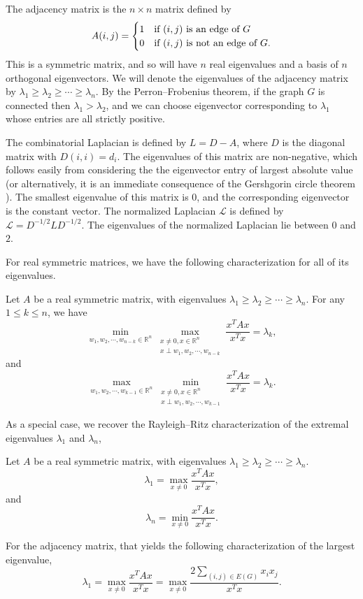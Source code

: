 The adjacency matrix is the $n \times n$ matrix defined by
\[
 A(i,j) =
  \begin{cases} 
      \hfill 1 \hfill & \text{if $(i,j)$ is an edge of $G$} \\
      \hfill 0 \hfill & \text{if $(i,j)$ is not an edge of $G$.} \\
  \end{cases}
\]
This is a symmetric matrix, and so will have $n$ real eigenvalues and a basis of
$n$ orthogonal eigenvectors.  We will denote the eigenvalues of the adjacency matrix
by $\lambda_1 \geq \lambda_2 \geq \cdots \geq \lambda_n$.  By the Perron--Frobenius theorem,
if the graph $G$ is connected then $\lambda_1 > \lambda_2$, and we can choose
eigenvector corresponding to $\lambda_1$ whose entries are all strictly positive.


The combinatorial Laplacian is defined by $L = D - A$, where $D$ is the diagonal matrix
with $D(i,i) = d_i$.  The eigenvalues of this matrix are non-negative, which follows
easily from considering the the eigenvector entry of largest absolute value (or alternatively,
it is an immediate consequence of the Gershgorin circle theorem \cite{HornJohnson2012}).
The smallest eigenvalue of this matrix is $0$, and the corresponding eigenvector is the
constant vector.
The normalized Laplacian $\mathcal{L}$ is defined by $\mathcal{L} = D^{-1/2} L D^{-1/2}$.
The eigenvalues of the normalized Laplacian lie between $0$ and $2$.

For real symmetric matrices, we have the following characterization for all of its eigenvalues.
\begin{theorem}
  Let $A$ be a real symmetric matrix, with
   eigenvalues $\lambda_1 \geq \lambda_2 \geq \cdots \geq \lambda_n$.
  For any $1 \leq k \leq n$, we have
  \[ \min_{w_1, w_2, \cdots, w_{n-k} \in \mathbb{R}^n} \max_{\substack{x\neq 0, x \in \mathbb{R}^n\\x \perp w_1, w_2, \cdots, w_{n-k}}} \frac{x^T A x}{x^T x} = \lambda_k, \]
  and
  \[ \max_{w_1, w_2, \cdots, w_{k-1} \in \mathbb{R}^n} \min_{\substack{x\neq 0, x \in \mathbb{R}^n\\x \perp w_1, w_2, \cdots, w_{k-1}}} \frac{x^T A x}{x^T x} = \lambda_k .\]
  
\end{theorem}
\noindent As a special case, we recover the Rayleigh--Ritz characterization of the extremal eigenvalues
$\lambda_1$ and $\lambda_n$,
\begin{theorem}\label{rayleigh quotient}
  Let $A$ be a real symmetric matrix, with
   eigenvalues $\lambda_1 \geq \lambda_2 \geq \cdots \geq \lambda_n$.
  \[ \lambda_1 = \max_{x \neq 0} \frac{x^T A x}{x^T x},\]
  and
  \[ \lambda_n = \min_{x \neq 0} \frac{x^T A x}{x^T x}.\]  
\end{theorem}
\noindent For the adjacency matrix, that yields the following characterization of the largest
eigenvalue,
\[ \lambda_1 = \max_{x \neq 0} \frac{x^T A x}{x^T x} = \max_{x \neq 0} \frac{2\sum_{(i,j) \in E(G)} x_i x_j}{x^T x}.\]



